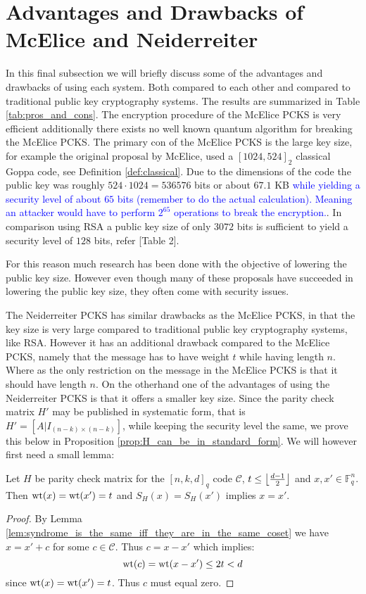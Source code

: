 \section{Advantages and Drawbacks of McElice and Neiderreiter}%
In this final subsection we will briefly discuss some of the advantages and drawbacks of using each system. Both compared to each other and compared to traditional public key cryptography systems. The results are summarized in Table \ref{tab:pros_and_cons}. The encryption procedure of the McElice PCKS is very efficient additionally there exists no well known quantum algorithm for breaking the McElice PCKS. The primary con of the McElice PCKS is the large key size, for example the original proposal by McElice, used a $[1024, 524]_2$ classical Goppa code, see Definition \ref{def:classical}. Due to the dimensions of the code the public key was roughly $524 \cdot 1024 = 536576$ bits or about $67.1$ KB \textcolor{blue}{while yielding a security level of about $65$ bits (remember to do the actual calculation). Meaning an attacker would have to perform $2^{65}$ operations to break the encryption.}. In comparison using RSA a public key size of only $3072$ bits is sufficient to yield a security level of $128$ bits, refer \cite{nist_recomendations_for_key_management}[Table 2].

For this reason much research has been done with the objective of lowering the public key size. However even though many of these proposals have succeeded in lowering the public key size, they often come with security issues.

The Neiderreiter PCKS has similar drawbacks as the McElice PCKS, in that the key size is very large compared to traditional public key cryptography systems, like RSA. However it has an additional drawback compared to the McElice PCKS, namely that the message has to have weight $t$ while having length $n$. Where as the only restriction on the message in the McElice PCKS is that it should have length $n$. On the otherhand one of the advantages of using the Neiderreiter PCKS is that it offers a smaller key size. Since the parity check matrix $H'$ may be published in systematic form, that is $H' = [A | I_{(n - k) \times (n - k)}]$, while keeping the security level the same, we prove this below in Proposition \ref{prop:H_can_be_in_standard_form}. We will however first need a small lemma:

\begin{lemma}\label{lem:equal_syndrome_and_equal_weight}
  Let $H$ be parity check matrix for the $[n, k, d]_q$ code $\mathcal{C}$, $t \leq \left\lfloor\frac{d - 1}{2}\right\rfloor$ and $x, x' \in \mathbb{F}_q^n$. Then $\mathrm{wt}(x) = \mathrm{wt}(x') = t$ and $S_H(x) = S_H(x')$ implies $x = x'$.
\end{lemma}
\begin{proof}
  By Lemma \ref{lem:syndrome_is_the_same_iff_they_are_in_the_same_coset} we have $x = x' + c$ for some $c \in \mathcal{C}$. Thus $c = x - x'$ which implies:
  \begin{equation*}
    \mathrm{wt}(c) = \mathrm{wt}(x - x') \leq 2t < d
  \end{equation*}
  since $\mathrm{wt}(x) = \mathrm{wt}(x') = t$. Thus $c$ must equal zero.
\end{proof}

